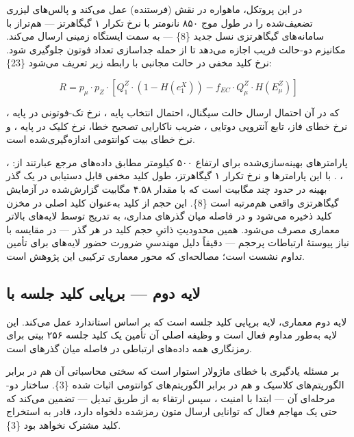 \documentclass[a4paper,14pt]{extreport}
\begin{document}
در این پروتکل، ماهواره در نقش  (فرستنده) عمل می‌کند و پالس‌های لیزری تضعیف‌شده را در طول موج ۸۵۰ نانومتر با نرخ تکرار ۱ گیگاهرتز --- هم‌تراز با سامانه‌های گیگاهرتزی نسل جدید \{8\} --- به سمت ایستگاه زمینی ارسال می‌کند. مکانیزم دو-حالت فریب  اجازه می‌دهد تا از حمله جداسازی تعداد فوتون  جلوگیری شود. نرخ کلید مخفی  در حالت مجانبی با رابطه زیر تعریف می‌شود \{23\}:

\begin{equation}
R = p_\mu \cdot p_Z \cdot \left[Q_1^Z \cdot \left(1 - H(e_1^X)\right) - f_{EC} \cdot Q_\mu^Z \cdot H(E_\mu^Z)\right]
\label{eq:skr}
\end{equation}

که در آن  احتمال ارسال حالت سیگنال،  احتمال انتخاب پایه ،  نرخ تک-فوتونی در پایه ،  نرخ خطای فاز،  تابع آنتروپی دوتایی ،  ضریب ناکارایی تصحیح خطا،  نرخ کلیک در پایه ، و  نرخ خطای بیت کوانتومی  اندازه‌گیری‌شده است.

پارامترهای بهینه‌سازی‌شده برای ارتفاع ۵۰۰ کیلومتر مطابق داده‌های مرجع  عبارتند از: ، ، . با این پارامترها و نرخ تکرار ۱ گیگاهرتز، طول کلید مخفی قابل دستیابی در یک گذر بهینه در حدود چند مگابیت است که با مقدار ۴.۵۸ مگابیت گزارش‌شده در آزمایش گیگاهرتزی واقعی هم‌مرتبه است \{8\}. این حجم از کلید به‌عنوان کلید اصلی  در مخزن کلید  ذخیره می‌شود و در فاصله میان گذرهای مداری، به تدریج توسط لایه‌های بالاتر معماری مصرف می‌شود. همین محدودیتِ ذاتیِ حجم کلید در هر گذر --- در مقایسه با نیاز پیوستهٔ ارتباطات پرحجم --- دقیقاً دلیل مهندسیِ ضرورت حضور لایه‌های  برای تأمین تداوم نشست است؛ مصالحه‌ای که محور معماری ترکیبی این پژوهش است.
\subsection{لایه دوم --- برپایی کلید جلسه با }

لایه دوم معماری، لایه برپایی کلید جلسه  است که بر اساس استاندارد  عمل می‌کند. این لایه به‌طور مداوم فعال است و وظیفه اصلی آن تأمین یک کلید جلسه ۲۵۶ بیتی برای رمزنگاری همه داده‌های ارتباطی در فاصله میان گذرهای  است.

 بر مسئله یادگیری با خطای ماژولار  استوار است که سختی محاسباتی آن هم در برابر الگوریتم‌های کلاسیک و هم در برابر الگوریتم‌های کوانتومی اثبات شده \{3\}. ساختار دو-مرحله‌ای آن --- ابتدا  با امنیت ، سپس ارتقاء به  از طریق تبدیل  --- تضمین می‌کند که حتی یک مهاجم فعال که توانایی ارسال متون رمزشده دلخواه دارد، قادر به استخراج کلید مشترک نخواهد بود \{3\}.
\end{document}
